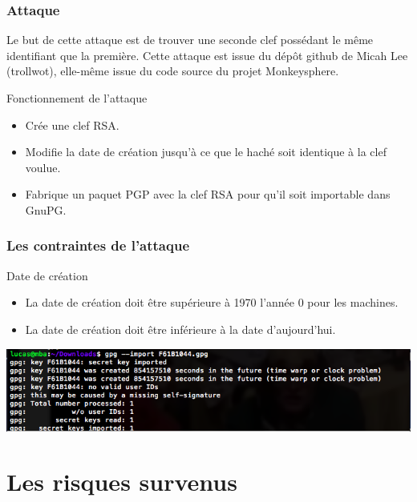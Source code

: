\begin{frame}
  \frametitle{\color{white}Attaque}
  \begin{block}{ }
  Le but de cette attaque est de trouver une seconde clef possédant le même identifiant que la première. 
  Cette attaque est issue du dépôt github de Micah Lee (trollwot), elle-même issue du code source du projet Monkeysphere.
  \end{block}
  \begin{block}{Fonctionnement de l'attaque}
      \begin{itemize}
        \item Crée une clef RSA.
        \item Modifie la date de création jusqu'à ce que le haché soit identique à la clef voulue.
        \item Fabrique un paquet PGP avec la clef RSA pour qu'il soit importable dans GnuPG.
      \end{itemize}
  \end{block}
\end{frame}

\begin{frame}
  \frametitle{\color{white}Les contraintes de l'attaque}
  \begin{block}{Date de création}
      \begin{itemize}
        \item La date de création doit être supérieure à 1970 l'année 0 pour les machines.
        \item La date de création doit être inférieure à la date d'aujourd'hui.
      \end{itemize}
    \end{block}
    \medbreak
    \includegraphics[scale=0.42]{attaque.png}
\end{frame}


\section{Les risques survenus}
